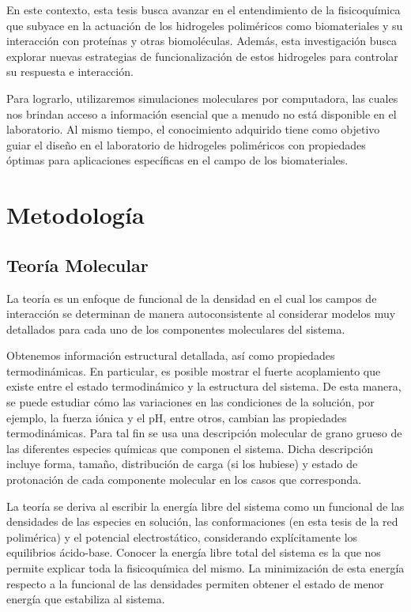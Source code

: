 En este contexto, esta tesis busca avanzar en el entendimiento de la fisicoqu\'imica que subyace en la actuaci\'on de los hidrogeles polim\'ericos como biomateriales y su interacci\'on con prote\'inas y otras biomol\'eculas. Adem\'as, esta investigaci\'on busca explorar nuevas estrategias de funcionalizaci\'on de estos hidrogeles para controlar su respuesta e interacci\'on.

Para lograrlo, utilizaremos simulaciones moleculares por computadora, las cuales nos brindan acceso a informaci\'on esencial que a menudo no est\'a disponible en el laboratorio. Al mismo tiempo, el conocimiento adquirido tiene como objetivo guiar el dise\~no en el laboratorio de hidrogeles polim\'ericos con propiedades \'optimas para aplicaciones espec\'ificas en el campo de los biomateriales.



\section{Metodolog\'ia}

\subsection{Teor\'ia Molecular}

La teor\'ia es un enfoque de funcional de la densidad en el cual los campos de interacción se determinan de manera autoconsistente al considerar modelos muy detallados para cada uno de los componentes moleculares del sistema.

Obtenemos informaci\'on estructural detallada, as\'i como propiedades termodin\'amicas. En particular, es posible mostrar el fuerte acoplamiento que existe entre el estado termodin\'amico y la estructura del sistema. De esta manera, se puede estudiar c\'omo las variaciones en las condiciones de la soluci\'on, por ejemplo, la fuerza i\'onica y el pH, entre otros, cambian las propiedades termodin\'amicas.
Para tal fin se usa una descripci\'on molecular de grano grueso de las diferentes especies qu\'imicas que componen el sistema. Dicha descripci\'on incluye forma, tama\~no, distribuci\'on de carga (si los hubiese) y estado de protonaci\'on de cada componente molecular en los casos que corresponda.

La teor\'ia se deriva al escribir la energía libre del sistema como un funcional de las densidades de las especies en soluci\'on, las conformaciones (en esta tesis de la red polim\'erica) y el potencial electrost\'atico, considerando expl\'icitamente los equilibrios \'acido-base.
Conocer la energ\'ia libre total del sistema es la que nos permite explicar toda la fisicoqu\'imica del mismo. La minimizaci\'on de esta energ\'ia respecto a la funcional de las densidades permiten obtener el estado de menor energ\'ia que estabiliza al sistema.

